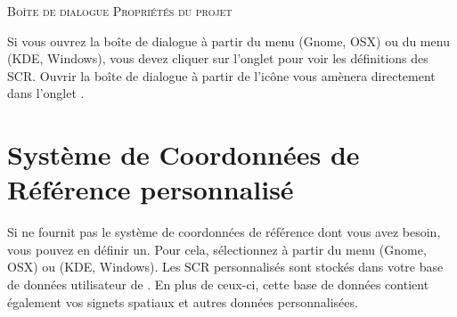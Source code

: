 \begin{Tip}
\caption{\textsc{Boîte de dialogue Propriétés du projet}}
Si vous ouvrez la boîte de dialogue  à partir du menu  (Gnome, OSX) ou du menu   (KDE, Windows), vous devez cliquer sur l'onglet  pour voir les définitions des SCR. Ouvrir la boîte de dialogue à partir de l'icône  vous amènera  directement dans l'onglet . \end{Tip}  %
\section{Système de Coordonnées de Référence personnalisé}
\label{sec:customprojections}

Si \qg ne fournit pas le système de coordonnées de référence dont vous avez besoin, vous pouvez en définir un. Pour cela, sélectionnez  à partir du menu  (Gnome, OSX) ou  (KDE, Windows).  Les SCR personnalisés sont stockés dans votre base de données utilisateur de \qg.  En plus de ceux-ci, cette base de données contient également vos signets  spatiaux et autres données personnalisées.

